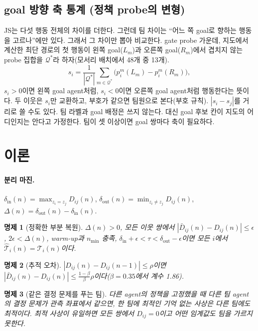 \documentclass[10pt]{article}
\newtheorem{proposition}{명제}
\begin{document}
\subsection{goal 방향 축 통계 (정책 probe의 변형)}
\label{sec:axis-method}
JS는 다섯 행동 전체의 차이를 더한다. 그런데 팀 차이는 ``어느 쪽 goal로 향하는 행동을 고르나''에만 있다. 그래서 그 차이만 뽑아 비교한다.
gate probe 가운데, 지도에서 계산한 최단 경로의 첫 행동이 왼쪽 goal($L_m$)과 오른쪽 goal($R_m$)에서 겹치지 않는 probe 집합을 $\mathcal{Q}^{*}$라 하자(모서리 배치에서 48개 중 13개).
\[
  s_i = \frac{1}{|\mathcal{Q}^{*}|}\sum_{m \in \mathcal{Q}^{*}} \Big( p_i^m(L_m) - p_i^m(R_m) \Big),
\]
$s_i > 0$이면 왼쪽 goal agent처럼, $s_i < 0$이면 오른쪽 goal agent처럼 행동한다는 뜻이다.
두 이웃은 $s_i$만 교환하고, 부호가 같으면 팀원으로 본다(부호 규칙). $|s_i - s_j|$를 거리로 쓸 수도 있다.
팀 라벨과 goal 배정은 쓰지 않는다. 대신 goal 후보 칸이 지도의 어디인지는 안다고 가정한다. 팀이 셋 이상이면 goal 쌍마다 축이 필요하다.

\section{이론}

\paragraph{분리 마진.} $\delta_{\mathrm{in}}(n) = \max_{z_i = z_j} D_{ij}(n)$, $\delta_{\mathrm{out}}(n) = \min_{z_i \ne z_j} D_{ij}(n)$, $\Delta(n) = \delta_{\mathrm{out}}(n) - \delta_{\mathrm{in}}(n)$.

\begin{proposition}[정확한 부분 복원]
$\Delta(n) > 0$, 모든 이웃 쌍에서 $|\bar D_{ij}(n) - D_{ij}(n)| \le \epsilon$, $2\epsilon < \Delta(n)$, warm-up과 $n_{\min}$ 충족, $\delta_{\mathrm{in}} + \epsilon < \tau < \delta_{\mathrm{out}} - \epsilon$이면 모든 $i$에서 $\hat{\mathcal{T}}_i(n) = \mathcal{T}_i(n)$이다.
\end{proposition}

\begin{proposition}[추적 오차]
$|D_{ij}(n) - D_{ij}(n-1)| \le \rho$이면 $|\bar D_{ij}(n) - D_{ij}(n)| \le \frac{1-\beta}{\beta}\rho$이다($\beta = 0.35$에서 계수 1.86).
\end{proposition}

\begin{proposition}[같은 결정 문제를 푸는 팀]
다른 agent의 정책을 고정했을 때 다른 팀 agent의 결정 문제가 관측 좌표에서 같으면, 한 팀에 최적인 기억 없는 사상은 다른 팀에도 최적이다. 최적 사상이 유일하면 모든 쌍에서 $D_{ij} = 0$이고 어떤 임계값도 팀을 가르지 못한다.
\end{proposition}
\end{document}
